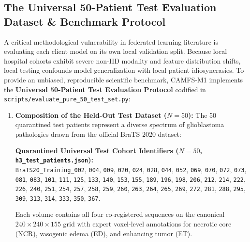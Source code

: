 \documentclass[10pt,a4paper]{article}
\begin{document}
\subsection{The Universal 50-Patient Test Evaluation Dataset \& Benchmark Protocol}
\label{sec:test_eval_dataset}
A critical methodological vulnerability in federated learning literature is evaluating each client model on its own local validation split. Because local hospital cohorts exhibit severe non-IID modality and feature distribution shifts, local testing confounds model generalization with local patient idiosyncrasies. To provide an unbiased, reproducible scientific benchmark, CAMFS-M1 implements the \textbf{Universal 50-Patient Test Evaluation Protocol} codified in \texttt{scripts/evaluate\_pure\_50\_test\_set.py}:

\begin{enumerate}[itemsep=2pt, topsep=2pt]
    \item \textbf{Composition of the Held-Out Test Dataset ($N = 50$):}
    The 50 quarantined test patients represent a diverse spectrum of glioblastoma pathologies drawn from the official BraTS 2020 dataset:
    \begin{center}
    \begin{tcolorbox}[colback=boxbg, colframe=borderblue, arc=1.5mm, boxrule=0.8pt, left=2.5mm, right=2.5mm, top=2mm, bottom=2mm]
    \footnotesize \textbf{Quarantined Universal Test Cohort Identifiers ($N=50$, \texttt{h3\_test\_patients.json}):}\\
    \texttt{BraTS20\_Training\_002}, \texttt{004}, \texttt{009}, \texttt{020}, \texttt{024}, \texttt{028}, \texttt{044}, \texttt{052}, \texttt{069}, \texttt{070}, \texttt{072}, \texttt{073}, \texttt{081}, \texttt{083}, \texttt{101}, \texttt{111}, \texttt{125}, \texttt{133}, \texttt{140}, \texttt{153}, \texttt{155}, \texttt{189}, \texttt{196}, \texttt{198}, \texttt{206}, \texttt{212}, \texttt{214}, \texttt{222}, \texttt{226}, \texttt{240}, \texttt{251}, \texttt{254}, \texttt{257}, \texttt{258}, \texttt{259}, \texttt{260}, \texttt{263}, \texttt{264}, \texttt{265}, \texttt{269}, \texttt{272}, \texttt{281}, \texttt{288}, \texttt{295}, \texttt{309}, \texttt{313}, \texttt{314}, \texttt{333}, \texttt{350}, \texttt{367}.
    \end{tcolorbox}
    \end{center}
    Each volume contains all four co-registered sequences on the canonical $240 \times 240 \times 155$ grid with expert voxel-level annotations for necrotic core (NCR), vasogenic edema (ED), and enhancing tumor (ET).


\end{enumerate}
\end{document}
